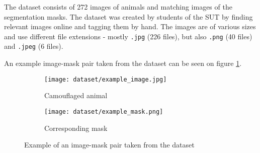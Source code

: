 \documentclass[../main.tex]{subfiles}
\begin{document}
\newcommand{\code}[1]{
	\colorbox{light-gray}{\texttt{#1}}
}

The dataset consists of 272 images of animals and matching images of the segmentation masks. The dataset was created by students of the SUT by finding relevant images online and tagging them by hand.
The images are of various sizes and use different file extensions - mostly \code{.jpg} (226 files), but also \code{.png} (40 files) and \code{.jpeg} (6 files).

An example image-mask pair taken from the dataset can be seen on figure \ref{fig:dataset:image-mask-example}.

\begin{figure}[htb]
	\centering
	\begin{subfigure}{0.45\textwidth}
		\centering
		\texttt{[image: dataset/example\_image.jpg]}
		\caption{Camouflaged animal}
	\end{subfigure}
	\begin{subfigure}{0.45\textwidth}
		\centering
		\texttt{[image: dataset/example\_mask.png]}
		\caption{Corresponding mask}
	\end{subfigure}

	\caption{Example of an image-mask pair taken from the dataset}
	\label{fig:dataset:image-mask-example}

\end{figure}
\end{document}
